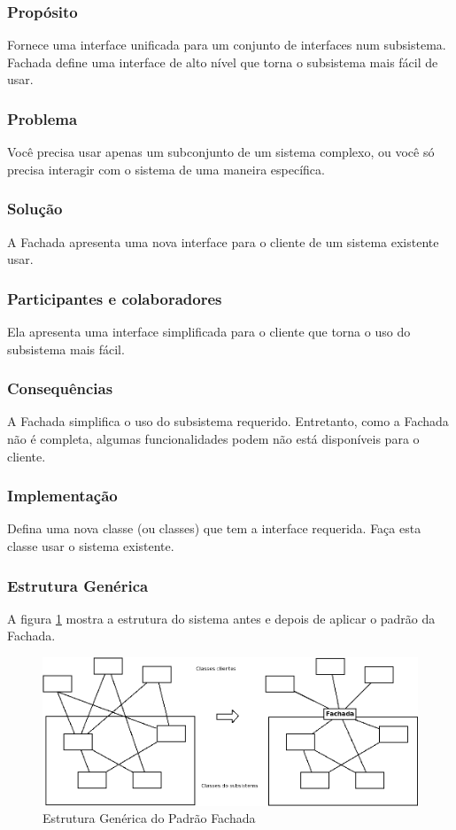 \documentclass[
	11pt,				%
	openright,
	twoside,			%
	a4paper,			%
	english,			%
	french,
	brazil,				%
	sumario=tradicional
	]{abntex2}
\begin{document}
\subsubsection{Propósito}
Fornece uma interface unificada para um conjunto de interfaces num subsistema. Fachada define uma interface de alto nível que torna o subsistema mais fácil de usar.

\subsubsection{Problema}
Você precisa usar apenas um subconjunto de um sistema complexo, ou você só precisa interagir com o sistema de uma maneira específica.

\subsubsection{Solução}
A Fachada apresenta uma nova interface para o cliente de um sistema existente usar.

\subsubsection{Participantes e colaboradores}
Ela apresenta uma interface simplificada para o cliente que torna o uso do subsistema mais fácil.

\subsubsection{Consequências}
A Fachada simplifica o uso do subsistema requerido. Entretanto, como a Fachada não é completa, algumas funcionalidades podem não está disponíveis para o cliente.

\subsubsection{Implementação}
Defina uma nova classe (ou classes) que tem a interface requerida. Faça esta classe usar o sistema existente.

\subsubsection{Estrutura Genérica}
A figura \ref{fig:fachada} mostra a estrutura do sistema antes e depois de aplicar o padrão da Fachada.

\begin{figure}[h]
\begin{center}
\includegraphics[scale=0.42]{fachada.png}
\caption{Estrutura Genérica do Padrão Fachada}\label{fig:fachada}
\end{center}
\end{figure}
\end{document}
